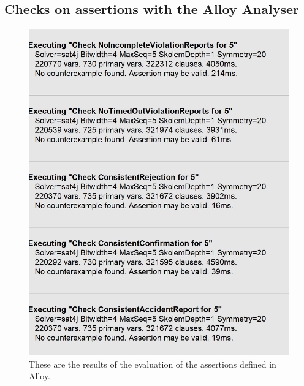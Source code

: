 \documentclass{article}
\begin{document}
		\subsection{Checks on assertions with the Alloy Analyser}
		\begin{figure}[H]
			\centering
			\includegraphics[width=1\textwidth]{images/AlloyAssertionsChecks.png}
			\caption[Alloy Analyser results]{These are the results of the evaluation of the assertions defined in Alloy.}
			\label{fig:check_assertions}
		\end{figure}
	
\end{document}
